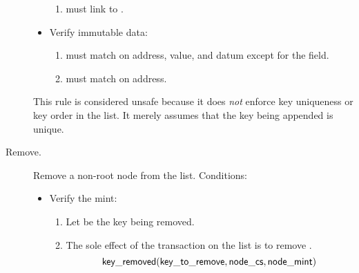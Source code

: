 \documentclass[../midgard.tex]{subfiles}
\begin{document}
\begin{description}
\begin{itemize}
\begin{enumerate}[resume]
                \item {} must link to .
            \end{enumerate}
            
            \item Verify immutable data:
            \begin{enumerate}[resume]
                \item {} must match  on address, value, and datum except for the  field.
                \item {} must match  on address.
            \end{enumerate}
        \end{itemize}

    This rule is considered unsafe because it does \emph{not} enforce key uniqueness or key order in the list. It merely assumes that the key being appended is unique.

    \unorderedListWarning 

    \item[Remove.] Remove a non-root node from the list. Conditions:
        \begin{itemize}
            \item Verify the mint:
            \begin{enumerate}
                \item Let  be the key being removed.
                \item The sole effect of the transaction on the list is to remove .
                    \begin{equation*}
                        \mathsf{key\_removed}(\mathsf{key\_to\_remove}, \mathsf{node\_cs}, \mathsf{node\_mint})
                    \end{equation*}
            \end{enumerate}
            

\end{itemize}
\end{description}
\end{document}
